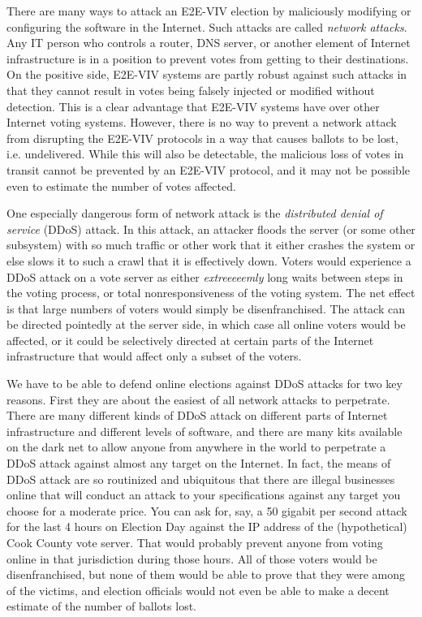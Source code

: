 There are many ways to attack an E2E-VIV election by maliciously
modifying or configuring the software in the Internet. Such attacks
are called \emph{network attacks}. Any IT person who controls a
router, DNS server, or another element of Internet infrastructure is
in a position to prevent votes from getting to their destinations.  On
the positive side, E2E-VIV systems are partly robust against such
attacks in that they cannot result in votes being falsely injected or
modified without detection. This is a clear advantage that E2E-VIV
systems have over other Internet voting systems. However, there is no
way to prevent a network attack from disrupting the E2E-VIV protocols
in a way that causes ballots to be lost, i.e. undelivered.  While this
will also be detectable, the malicious loss of votes in transit cannot
be prevented by an E2E-VIV protocol, and it may not be possible even
to estimate the number of votes affected.

One especially dangerous form of network attack is the
\emph{distributed denial of service} (DDoS) attack.  In this attack,
an attacker floods the server (or some other subsystem) with so much
traffic or other work that it either crashes the system or else slows
it to such a crawl that it is effectively down. Voters would
experience a DDoS attack on a vote server as either
\emph{extreeeeemly} long waits between steps in the voting process, or
total nonresponsiveness of the voting system. The net effect is that
large numbers of voters would simply be disenfranchised. The attack
can be directed pointedly at the server side, in which case all online
voters would be affected, or it could be selectively directed at
certain parts of the Internet infrastructure that would affect only a
subset of the voters.

We have to be able to defend online elections against DDoS attacks for
two key reasons.  First they are about the easiest of all network
attacks to perpetrate. There are many different kinds of DDoS attack
on different parts of Internet infrastructure and different levels of
software, and there are many kits available on the dark net to allow
anyone from anywhere in the world to perpetrate a DDoS attack against
almost any target on the Internet. In fact, the means of DDoS attack
are so routinized and ubiquitous that there are illegal businesses
online that will conduct an attack to your specifications against any
target you choose for a moderate price. You can ask for, say, a 50
gigabit per second attack for the last 4 hours on Election Day against
the IP address of the (hypothetical) Cook County vote server. That
would probably prevent anyone from voting online in that jurisdiction
during those hours. All of those voters would be disenfranchised, but
none of them would be able to prove that they were among of the
victims, and election officials would not even be able to make a
decent estimate of the number of ballots lost.

